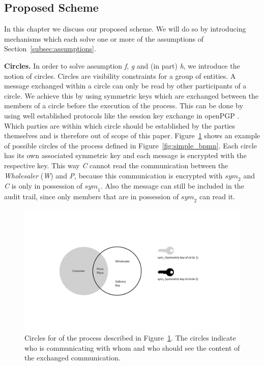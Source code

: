 \documentclass[runningheads]{llncs}
\newcommand{\ber}[1]{\textit{#1}}
\newcommand{\reffig}[1]{Figure~\ref{#1}}
\newcommand{\refsec}[1]{Section~\ref{#1}}
\newcommand{\creditfootnote}[1]{}
\begin{document}
\subsection{Proposed Scheme} \label{subsec:scheme}

In this chapter we discuss our proposed scheme. We will do so by introducing mechanisms which each solve one or more of the assumptions of \refsec{subsec:assumptions}.



\textbf{Circles.} In order to solve assumption \ber{f}, \ber{g} and (in part) \ber{h}, we introduce the notion of circles. Circles are visibility constraints for a group of entities. A message exchanged within a circle can only be read by other participants of a circle. We achieve this by using symmetric keys which are exchanged between the members of a circle before the execution of the process. This can be done by using well established protocols like the session key exchange in openPGP \cite{openpgp}. Which parties are within which circle should be established by the parties themselves and is therefore out of scope of this paper. \reffig{fig:circles} shows an example of possible circles of the process defined in  \reffig{fig:simple_bpmn}. Each circle has its own associated symmetric key and each message is encrypted with the respective key. This way \ber{C} cannot read the communication between the \ber{Wholesaler} (\ber{W}) and \ber{P}, because this communication is encrypted with ${sym}_2$ and \ber{C} is only in possession of ${sym}_1$. Also the message can still be included in the audit trail, since only members that are in possession of ${sym}_2$ can read it.\creditfootnote{Credit: key-icons in \reffig{fig:circles} made by Yannick (http://yanlu.de) from www.flaticon.com}


\begin{center}
\begin{figure}
    \centering
    \includegraphics[trim=5cm 5cm 6cm 5.6cm,clip=true,scale=0.5]{circles.png}
    \caption{Circles for of the process described in \reffig{fig:circles}. The circles indicate who is communicating with whom and who should see the content of the exchanged communication.} 
    \label{fig:circles}
\end{figure}
\end{center}
\end{document}
